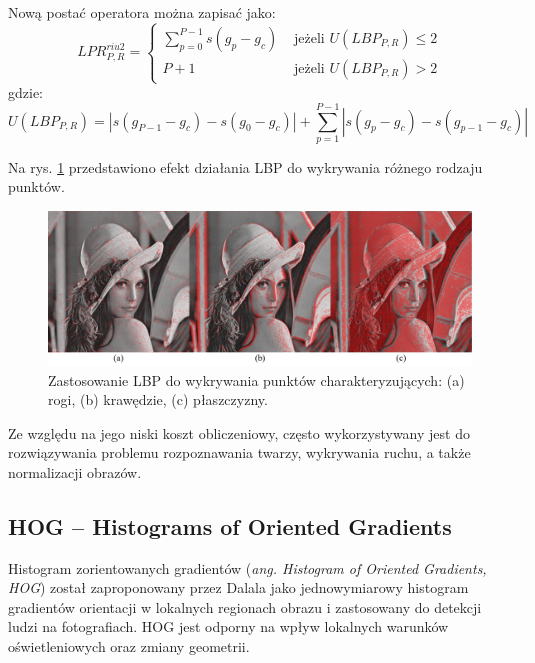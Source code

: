 Nową postać operatora można zapisać jako:
\begin{equation} 
\label{lbp_lbp_riu2} 
LPR_{P, R}^{riu2} = 
	\begin{cases}
		\sum\limits_{p=0}^{P-1} s(g_p - g_c) & \text{ jeżeli } U(LBP_{P, R}) \leq 2 \\
		P + 1 & \text{ jeżeli } U(LBP_{P, R}) > 2
	\end{cases}
\end{equation} gdzie: \begin{equation} 
\label{lbp_u_lbp} 
U(LBP_{P, R}) = | s(g_{P-1} - g_c) -s(g_0 - g_c) | + \sum\limits_{p=1}^{P-1} | s(g_p - g_c) - s(g_{p-1} - g_c) |
\end{equation}

Na rys. \ref{fig:lbp-features} przedstawiono efekt działania LBP do wykrywania różnego rodzaju punktów.

\begin{figure}[h]
	\centering
	\includegraphics[scale=0.39]{graphics/01_podstawy_teoretyczne/lbp-features.pdf}
	\caption{ Zastosowanie LBP do wykrywania punktów charakteryzujących: (a) rogi, (b) krawędzie, (c) płaszczyzny.  }
	\label{fig:lbp-features}
\end{figure}

Ze względu na jego niski koszt obliczeniowy, często wykorzystywany jest do rozwiązywania problemu rozpoznawania twarzy\cite{AHONEN04}\cite{HEUSCH06}\cite{MATURANA09}, wykrywania ruchu\cite{HEIKKILA04}, a także normalizacji obrazów\cite{JUST06}.


\subsection{HOG -- Histograms of Oriented Gradients}

Histogram zorientowanych gradientów (\emph{ang. Histogram of Oriented Gradients, HOG}) został zaproponowany przez Dalala jako jednowymiarowy histogram gradientów orientacji w lokalnych regionach obrazu i zastosowany do detekcji ludzi na fotografiach.\cite{DALAL05} HOG jest odporny na wpływ lokalnych warunków oświetleniowych oraz zmiany geometrii.\cite{YAMAUCHI11}

